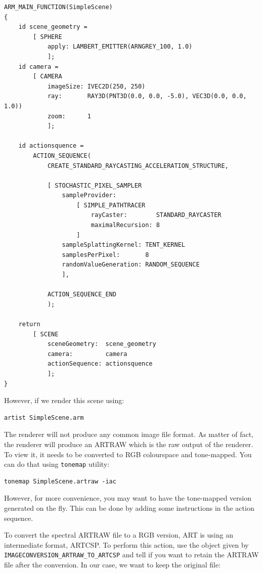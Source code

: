 \documentclass[a4paper,chapterprefix]{scrbook}
\begin{document}
\begin{lstlisting}
ARM_MAIN_FUNCTION(SimpleScene)
{
    id scene_geometry = 
        [ SPHERE 
            apply: LAMBERT_EMITTER(ARNGREY_100, 1.0) 
            ];
    id camera =
        [ CAMERA
            imageSize: IVEC2D(250, 250)
            ray:       RAY3D(PNT3D(0.0, 0.0, -5.0), VEC3D(0.0, 0.0, 1.0))
            zoom:      1
            ];
    
    id actionsquence = 
        ACTION_SEQUENCE(
            CREATE_STANDARD_RAYCASTING_ACCELERATION_STRUCTURE,
    
            [ STOCHASTIC_PIXEL_SAMPLER
                sampleProvider:
                    [ SIMPLE_PATHTRACER
                        rayCaster:        STANDARD_RAYCASTER
                        maximalRecursion: 8
                    ]
                sampleSplattingKernel: TENT_KERNEL
                samplesPerPixel:       8
                randomValueGeneration: RANDOM_SEQUENCE
                ],

            ACTION_SEQUENCE_END
            );
    
    return 
        [ SCENE
            sceneGeometry:  scene_geometry
            camera:         camera
            actionSequence: actionsquence
            ];
}
\end{lstlisting}

However, if we render this scene using:

\begin{verbatim}
artist SimpleScene.arm
\end{verbatim}

The renderer will not produce any common image file format. As matter of fact, the renderer will produce an ARTRAW which is the raw output of the renderer. To view it, it needs to be converted to RGB colourspace and tone-mapped. You can do that using \verb?tonemap? utility:

\begin{verbatim}
tonemap SimpleScene.artraw -iac
\end{verbatim}

However, for more convenience, you may want to have the tone-mapped version generated on the fly. This can be done by adding some instructions in the action sequence.

To convert the spectral ARTRAW file to a RGB version, ART is using an intermediate format, ARTCSP. To perform this action, use the object given by \verb?IMAGECONVERSION_ARTRAW_TO_ARTCSP? and tell if you want to retain the ARTRAW file after the conversion. In our case, we want to keep the original file:
\end{document}
